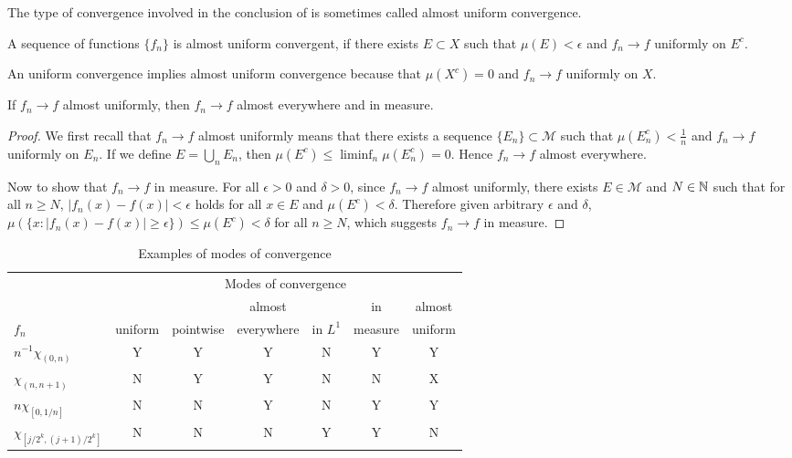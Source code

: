 The type of convergence involved in the conclusion of  is sometimes called almost uniform convergence. 

\begin{definition}
    A sequence of functions $\{ f_n \}$ is almost uniform convergent, if there exists $E \subset X$ such that $\mu(E) < \epsilon$ and $f_n \to f$ uniformly on $E^c$.
\end{definition}

An uniform convergence implies almost uniform convergence because that $\mu(X^c) = 0$ and $f_n \to f$ uniformly on $X$.

\begin{proposition}
    If $f_n \to f$ almost uniformly, then $f_n \to f$ almost everywhere and in measure.
\end{proposition}

\begin{proof}
    We first recall that $f_n \to f$ almost uniformly means that there exists a sequence $\{ E_n \} \subset \mathcal{M}$ such that $\mu(E_n^c) < \frac{1}{n}$ and $f_n \to f$ uniformly on $E_n$.
    If we define $E = \bigcup_{n} E_n$, then $\mu(E^c) \le \liminf_{n} \mu(E_n^c) = 0$.
    Hence $f_n \to f$ almost everywhere.

    Now to show that $f_n \to f$ in measure.
    For all $\epsilon > 0$ and $\delta > 0$, since $f_n \to f$ almost uniformly, there exists $E \in \mathcal{M}$ and $N \in \mathbb{N}$ such that for all $n \ge N$, $|f_n(x) - f(x)| < \epsilon$ holds for all $x \in E$ and $\mu(E^c) < \delta$.
    Therefore given arbitrary $\epsilon$ and $\delta$, $\mu(\{ x: |f_n(x) - f(x)| \ge \epsilon \}) \le \mu(E^c) < \delta$ for all $n \ge N$, which suggests $f_n \to f$ in measure.
\end{proof}

\begin{table*}[h!]
    \caption{Examples of modes of convergence}
    \begin{tabular}{lcccccc}
        \toprule 
                               & \multicolumn{6}{c}{Modes of convergence} \\
        \cmidrule(lr){2-7}
                               &         &           & almost     &          & in      & almost \\
        $f_n$                  & uniform & pointwise & everywhere & in $L^1$ & measure & uniform \\
        \midrule
        $n^{-1} \chi_{(0, n)}$ & Y       & Y         & Y          & N        & Y       & Y \\
        $\chi_{(n, n+1)}$      & N       & Y         & Y          & N        & N       & X \\
        $n \chi_{[0, 1/n]}$    & N       & N         & Y          & N        & Y       & Y \\
        $\chi_{[j/2^k, (j+1)/2^k]}$ & N  & N         & N          & Y        & Y       & N \\
        \bottomrule
    \end{tabular}
\end{table*}

